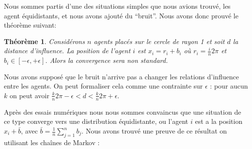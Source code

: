 \documentclass[a4paper,10pt]{report}
\newtheorem{theorem}{Théorème}
\begin{document}
Nous sommes partis d'une des situations simples que nous avions trouvé, les agent équidistants, et nous avons ajouté du ``bruit''. Nous avons donc prouvé le théorème suivant:
\begin{theorem}
Considérons $n$ agents placés sur le cercle de rayon 1 et soit $d$ la distance d'influence. La position de l'agent $i$ est $x_i = r_i + b_i$ où $r_i = \frac{i}{n} 2 \pi$ et $b_i \in [-\epsilon, +\epsilon]$. Alors la convergence sera non standard.
\end{theorem}

Nous avons supposé que le bruit n'arrive pas a changer les relations d'influence entre les agents. On peut formaliser cela comme une contrainte sur $\epsilon$ : pour aucun $k$ on peut avoir $\frac{k}{n} 2 \pi - \epsilon < d < \frac{k}{n} 2 \pi + \epsilon$.

Après des essais numériques nous nous sommes convaincus que une situation de ce type converge vers une distribution équidistante, ou l'agent $i$ est a la position $x_i + \bar b$, avec $\bar b = \frac{1}{n} \sum_{j=1}^n b_j$. Nous avons trouvé une preuve de ce résultat on utilisant les chaînes de Markov :
\end{document}
